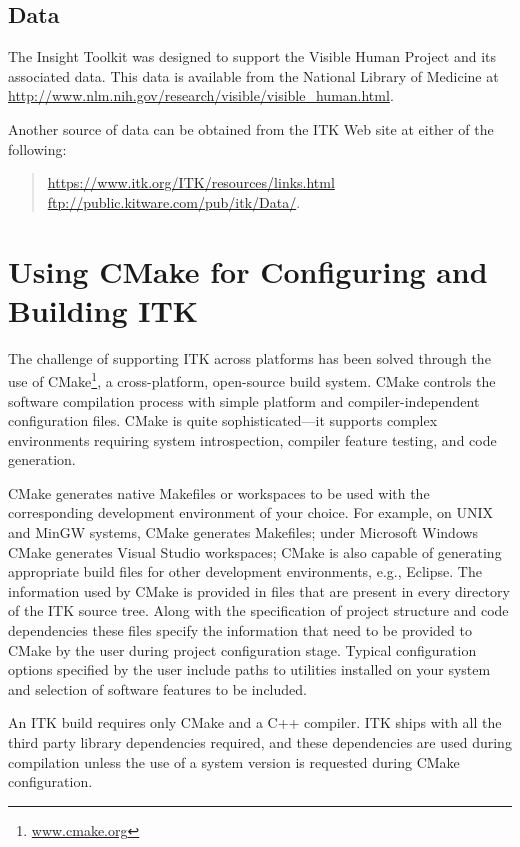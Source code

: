 \subsection{Data}
\label{sec:Data}

The Insight Toolkit was designed to support the Visible Human Project
and its associated data. This data is available from the National Library of
Medicine at \url{http://www.nlm.nih.gov/research/visible/visible_human.html}.

Another source of data can be obtained from the ITK Web site at either
of the following:
\begin{quote}
\url{https://www.itk.org/ITK/resources/links.html} \\
\url{ftp://public.kitware.com/pub/itk/Data/}.
\end{quote}

\section{Using CMake for Configuring and Building ITK}
\label{sec:UsingCMakeForConfiguringAndBuildingITK}

The challenge of supporting ITK across platforms has been solved through the
use of CMake\footnote{\url{www.cmake.org}}, a cross-platform, open-source build
system. CMake controls the software compilation process with simple platform
and compiler-independent configuration files. CMake is quite sophisticated---it
supports complex environments requiring system introspection, compiler feature
testing, and code generation.

CMake generates native Makefiles or workspaces to be used with the corresponding
development environment of your choice. For example, on UNIX and MinGW systems,
CMake generates Makefiles; under Microsoft Windows CMake generates Visual Studio
workspaces; CMake is also capable of generating appropriate build files for
other development environments, e.g., Eclipse. The information used by CMake is
provided in  files that are present in every directory of
the ITK source tree. Along with the specification of project structure and code
dependencies these files specify the information that need to be provided to
CMake by the user during project configuration stage. Typical configuration
options specified by the user include paths to utilities installed on your
system and selection of software features to be included.

An ITK build requires only CMake and a C++ compiler. ITK ships with all the
third party library dependencies required, and these dependencies are used
during compilation unless the use of a system version is requested during CMake
configuration.

